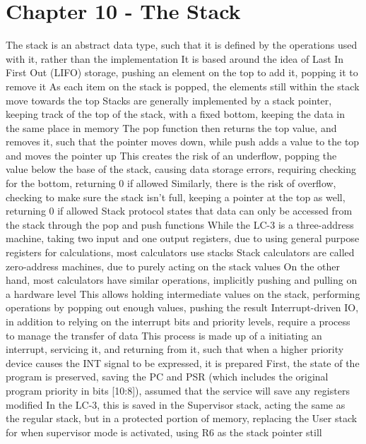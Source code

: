 \documentclass[11 pt, twoside]{article}
\newenvironment{outline*}
{
	\begin{outline}[enumerate]
	}
	{\end{outline}
}
\begin{document}
\section{Chapter 10 - The Stack}
\begin{outline*}
\1 The stack is an abstract data type, such that it is defined by the operations used with it, rather than the implementation
\2 It is based around the idea of Last In First Out (LIFO) storage, pushing an element on the top to add it, popping it to remove it
\2 As each item on the stack is popped, the elements still within the stack move towards the top
\1 Stacks are generally implemented by a stack pointer, keeping track of the top of the stack, with a fixed bottom, keeping the data in the same place in memory
\2 The pop function then returns the top value, and removes it, such that the pointer moves down, while push adds a value to the top and moves the pointer up
\3 This creates the risk of an underflow, popping the value below the base of the stack, causing data storage errors, requiring checking for the bottom, returning 0 if allowed
\3 Similarly, there is the risk of overflow, checking to make sure the stack isn't full, keeping a pointer at the top as well, returning 0 if allowed
\2 Stack protocol states that data can only be accessed from the stack through the pop and push functions
\1 While the LC-3 is a three-address machine, taking two input and one output registers, due to using general purpose registers for calculations, most calculators use stacks
\2 Stack calculators are called zero-address machines, due to purely acting on the stack values
\3 On the other hand, most calculators have similar operations, implicitly pushing and pulling on a hardware level
\2 This allows holding intermediate values on the stack, performing operations by popping out enough values, pushing the result
\1 Interrupt-driven IO, in addition to relying on the interrupt bits and priority levels, require a process to manage the transfer of data
\2 This process is made up of a initiating an interrupt, servicing it, and returning from it, such that when a higher priority device causes the INT signal to be expressed, it is prepared
\2 First, the state of the program is preserved, saving the PC and PSR (which includes the original program priority in bits [10:8]), assumed that the service will save any registers modified
\3 In the LC-3, this is saved in the Supervisor stack, acting the same as the regular stack, but in a protected portion of memory, replacing the User stack for when supervisor mode is activated, using R6 as the stack pointer still

\end{outline*}
\end{document}
